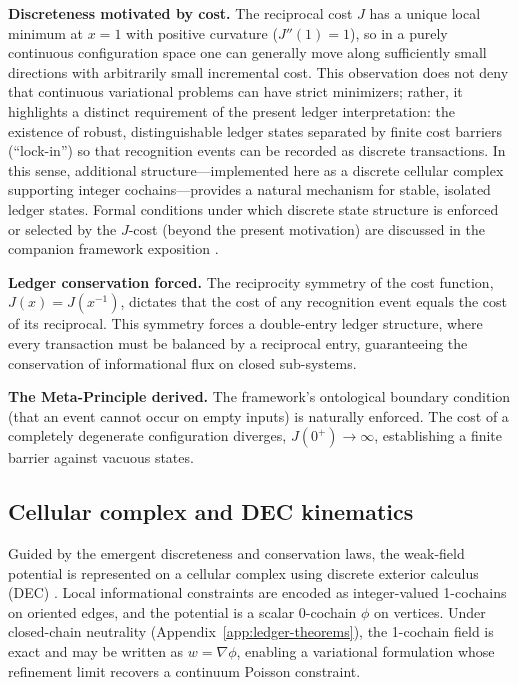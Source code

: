 \documentclass[entropy,article,submit,pdftex,moreauthors]{Definitions/mdpi}
\begin{document}
\textbf{Discreteness motivated by cost.} The reciprocal cost \(J\) has a unique local minimum at \(x=1\) with positive curvature (\(J''(1)=1\)), so in a purely continuous configuration space one can generally move along sufficiently small directions with arbitrarily small incremental cost. This observation does not deny that continuous variational problems can have strict minimizers; rather, it highlights a distinct requirement of the present ledger interpretation: the existence of robust, distinguishable ledger states separated by finite cost barriers (``lock-in'') so that recognition events can be recorded as discrete transactions. In this sense, additional structure—implemented here as a discrete cellular complex supporting integer cochains—provides a natural mechanism for stable, isolated ledger states. Formal conditions under which discrete state structure is enforced or selected by the \(J\)-cost (beyond the present motivation) are discussed in the companion framework exposition \cite{washburn2026ratio}.

\textbf{Ledger conservation forced.} The reciprocity symmetry of the cost function, \(J(x)=J(x^{-1})\), dictates that the cost of any recognition event equals the cost of its reciprocal. This symmetry forces a double-entry ledger structure, where every transaction must be balanced by a reciprocal entry, guaranteeing the conservation of informational flux on closed sub-systems.

\textbf{The Meta-Principle derived.} The framework's ontological boundary condition (that an event cannot occur on empty inputs) is naturally enforced. The cost of a completely degenerate configuration diverges, \(J(0^+) \to \infty\), establishing a finite barrier against vacuous states.

\subsection{Cellular complex and DEC kinematics}
\label{subsec:cellular_complex}

Guided by the emergent discreteness and conservation laws, the weak-field potential is represented on a cellular complex using discrete exterior calculus (DEC) \cite{bossavit1998,hirani2003,desbrun2005}. Local informational constraints are encoded as integer-valued 1-cochains on oriented edges, and the potential is a scalar 0-cochain \(\phi\) on vertices. Under closed-chain neutrality (Appendix~\ref{app:ledger-theorems}), the 1-cochain field is exact and may be written as \(w=\nabla\phi\), enabling a variational formulation whose refinement limit recovers a continuum Poisson constraint.
\end{document}

